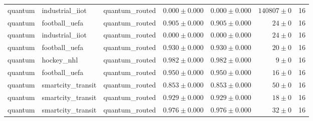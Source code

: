 \begin{table}[htbp]
\begin{tabular}{l l l r r r r}
quantum & industrial\_iiot & quantum\_routed & $0.000\pm0.000$ & $0.000\pm0.000$ & $140807\pm0$ & 16 \\
quantum & football\_uefa & quantum\_routed & $0.905\pm0.000$ & $0.905\pm0.000$ & $24\pm0$ & 16 \\
quantum & industrial\_iiot & quantum\_routed & $0.000\pm0.000$ & $0.000\pm0.000$ & $24\pm0$ & 16 \\
quantum & football\_uefa & quantum\_routed & $0.930\pm0.000$ & $0.930\pm0.000$ & $20\pm0$ & 16 \\
quantum & hockey\_nhl & quantum\_routed & $0.982\pm0.000$ & $0.982\pm0.000$ & $9\pm0$ & 16 \\
quantum & football\_uefa & quantum\_routed & $0.950\pm0.000$ & $0.950\pm0.000$ & $16\pm0$ & 16 \\
quantum & smartcity\_transit & quantum\_routed & $0.853\pm0.000$ & $0.853\pm0.000$ & $50\pm0$ & 16 \\
quantum & smartcity\_transit & quantum\_routed & $0.929\pm0.000$ & $0.929\pm0.000$ & $18\pm0$ & 16 \\
quantum & smartcity\_transit & quantum\_routed & $0.976\pm0.000$ & $0.976\pm0.000$ & $32\pm0$ & 16 \\
\hline
\end{tabular}
\end{table}
